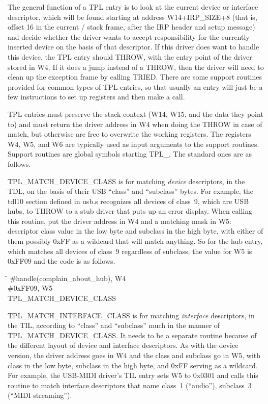The general function of a TPL entry is to look at the current device or
interface descriptor, which will be found starting at address
W14+IRP\_SIZE+8 (that is, offset 16 in the current /
stack frame, after the IRP header and setup message) and decide whether the
driver wants to accept responsibility for the currently inserted device on
the basis of that descriptor.  If this driver does want to handle this
device, the TPL entry should THROW, with the entry point of the driver
stored in W4.  If it does a jump instead of a THROW, then the driver will
need to clean up the exception frame by calling TRIED.  There are some
support routines provided for common types of TPL entries, so that usually
an entry will just be a few instructions to set up registers and then make a
call.

TPL entries must preserve the stack context (W14, W15, and the data they
point to) and must return the driver address in W4 when doing the THROW in
case of match, but otherwise are free to overwrite the working registers. 
The registers W4, W5, and W6 are typically used as input arguments to the
support routines.  Support routines are global symbols starting TPL\_.  The
standard ones are as follows.

TPL\_MATCH\_DEVICE\_CLASS is for matching \emph{device} descriptors, in the
TDL, on the
basis of their USB ``class'' and ``subclass'' bytes.  For example, the tdl10
section defined in usb.s recognizes all devices of class~9, which are USB
hubs, to THROW to a stub driver that puts up an error display.  When calling
this routine, put the driver address in W4 and a matching mask in W5:
descriptor class value in the low byte and subclass in the high byte, with
either of them possibly 0xFF as a wildcard that will match anything.  So for
the hub entry, which matches all devices of class~9 regardless of subclass,
the value for W5 is 0xFF09 and the code is as follows.
\begin{tabbing}
\qquad\=\qquad\qquad\=\kill
\>\>\#handle(complain\_about\_hub), W4\\
\>\>\#0xFF09, W5\\
\>\>TPL\_MATCH\_DEVICE\_CLASS\\
\end{tabbing}

TPL\_MATCH\_INTERFACE\_CLASS is for matching \emph{interface} descriptors, in
the TIL, according to ``class'' and ``subclass'' much in the manner of
TPL\_MATCH\_DEVICE\_CLASS.  It needs to be a separate routine because of the
different layout of device and interface descriptors.  As with the device
version, the driver address goes in W4 and the class and subclass go in W5,
with class in the low byte, subclass in the high byte, and 0xFF serving as a
wildcard.  For example, the USB-MIDI driver's TIL entry sets W5 to 0x0301
and calls this routine to match interface descriptors that name class~1
(``audio''), subclass~3 (``MIDI streaming'').

